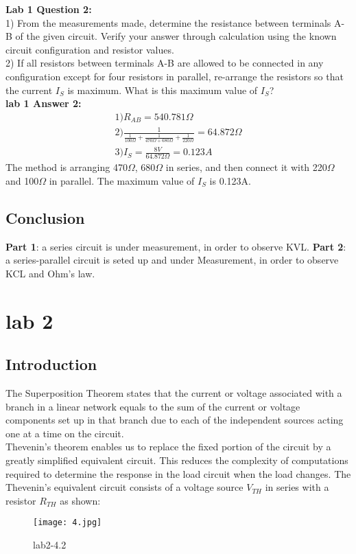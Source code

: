 \documentclass[12pt,fleqn]{article}
\begin{document}
\textbf{Lab 1 Question 2:}
\\1) From the measurements made, determine the resistance between terminals A-B of the given circuit. Verify your answer through calculation using the known circuit configuration and resistor values.\\
2) If all resistors between terminals A-B are allowed to be connected in any configuration except for four resistors in parallel, re-arrange the resistors so that the current $I_S$ is maximum. What is this maximum value of $I_S$?\\
\textbf{lab 1 Answer 2:}
\begin{gather}
1)  R_{AB} = 540.781\Omega \\
2)  \frac{1}{\frac{1}{100\Omega} + \frac{1}{470\Omega + 680\Omega} + \frac{1}{220\Omega}} = 64.872\Omega \\
3)  I_S = \frac{8V}{64.872\Omega} = 0.123A
\end{gather}
The method is arranging 470\ensuremath{\Omega}, 680\ensuremath{\Omega} in series, and then connect it with 220\ensuremath{\Omega} and 100\ensuremath{\Omega} in parallel. The maximum value of $I_S$ is 0.123A.
\subsection{Conclusion}
\textbf{Part 1}: a series circuit is under measurement, in order to observe KVL.
\textbf{Part 2}: a series-parallel circuit is seted up and under Measurement, in order to observe KCL and Ohm's law.
\section{lab 2}
\subsection{Introduction}

The Superposition Theorem states that the current or voltage associated with a branch in a linear network equals to the sum of the current or voltage components set up in that branch due to each of the independent sources acting one at a time on the circuit.\\
Thevenin's theorem enables us to replace the fixed portion of the circuit by a greatly simplified equivalent circuit. This reduces the complexity of computations required to determine the response in the load circuit when the load changes. The Thevenin’s equivalent circuit consists of a voltage source $V_{TH}$ in series with a resistor $R_{TH}$ as shown:
\begin{figure}[H]
\centering
\texttt{[image: 4.jpg]}
\caption{lab2-4.2}
\end{figure}
\end{document}
